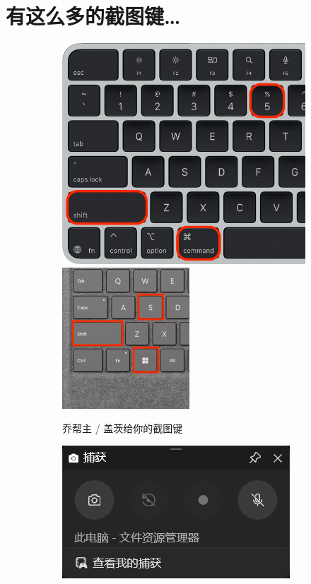 \documentclass[11pt, fontset = fandol, dvipdfmx]{ctexart}
\begin{document}
\pagestyle{fancy} \let \headrule \relax \cfoot{} \lhead{} \rhead{}

\section*{有这么多的截图键\ldots}

\begin{figure}[htbp]
  \begin{subfigure}{.48\linewidth}
    \centering
    \includegraphics[height = .48\linewidth]{macOS}\hspace{-3.33pt}
    \includegraphics[height = .48\linewidth]{Windows}
    \caption{乔帮主 / 盖茨给你的截图键}
  \end{subfigure}
  \hspace*{\fill}
  \begin{subfigure}{.48\linewidth}
    \centering
    \includegraphics[width = .96\linewidth, height = .48\linewidth]{xbox}

\end{subfigure}
\end{figure}
\end{document}
